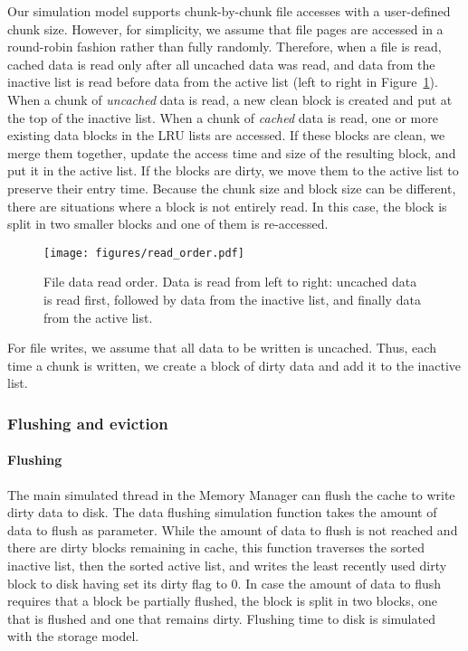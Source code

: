 \documentclass[conference]{IEEEtran}
\begin{document}
    Our simulation model supports chunk-by-chunk file accesses
    with a user-defined chunk size. However, for simplicity, we assume that file pages are 
    accessed in a round-robin fashion rather than fully randomly. 
    Therefore, when a file is read, cached data is read only after all uncached data was read, and data from the inactive list is read
    before data from the active list
    (left to right in Figure~\ref{fig:read_order}).
    When a chunk of \emph{uncached} data is read, a new clean block is created 
    and put at the top of the inactive list. 
    When a chunk of \emph{cached} data is read, one or more existing data blocks in the LRU lists are accessed.
    If these blocks are clean, we merge them together, update the access time and size of the resulting block, 
    and put it in the active list. 
    If the blocks are dirty, we move them to the active list to preserve their entry time. 
    Because the chunk size and block size can be different, there are situations
    where a block is not entirely read. 
    In this case, the block is split in two smaller blocks and one of them is re-accessed.
    \begin{figure}
           \centering
           \texttt{[image: figures/read\_order.pdf]}
           \caption{File data read order. Data is read from left to right: uncached data 
           is read first, followed by data from the inactive list, and finally data from the active list.}
           \label{fig:read_order}
    \end{figure}    

    For file writes, we assume that all data to be written is 
    uncached. Thus, each time a chunk is written, we create a block of dirty data 
    and add it to the inactive list.

    \subsubsection{Flushing and eviction}

    \paragraph*{Flushing}
    The main simulated thread in the Memory Manager can flush the
    cache to write dirty data to disk. The data flushing simulation
    function takes the amount of data to flush as parameter. While
    the amount of data to flush is not reached and there are dirty
    blocks remaining in cache, this function traverses the sorted
    inactive list, then the sorted active list, and writes the
    least recently used dirty block to disk having set its dirty
    flag to 0. In case the amount of data to flush requires that a
    block be partially flushed, the block is split in two blocks,
    one that is flushed and one that remains dirty. Flushing time
    to disk is simulated with the storage model.
    
\end{document}
